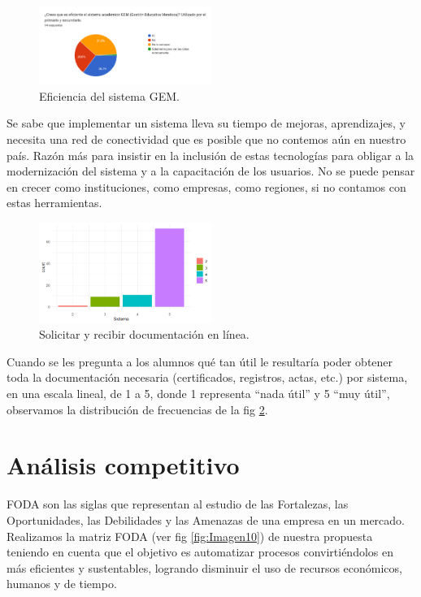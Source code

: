 \documentclass[a4paper]{article}
\begin{document}
\begin{figure}
\centering
\includegraphics[width=0.5\textwidth]{Imagen8.png}
\caption{\label{fig:Imagen8}Eficiencia del sistema GEM.}
\end{figure}

Se sabe que implementar un sistema lleva su tiempo de mejoras, aprendizajes, y necesita una red de conectividad que es posible que no contemos aún en nuestro país. Razón más para insistir en la inclusión de estas tecnologías para obligar a la modernización del sistema y a la capacitación de los usuarios. No se puede pensar en crecer como instituciones, como empresas, como regiones, si no contamos con estas herramientas. 


\begin{figure}
\centering
\includegraphics[width=0.5\textwidth]{Imagen9.png}
\caption{\label{fig:Imagen9}Solicitar y recibir documentación en línea.}
\end{figure}


Cuando se les pregunta a los alumnos qué tan útil le resultaría poder obtener toda la documentación necesaria (certificados, registros, actas, etc.) por sistema, en una escala lineal, de 1 a 5, donde 1 representa “nada útil” y 5 “muy útil”, observamos la distribución de frecuencias de la fig \ref{fig:Imagen9}.

\section{Análisis competitivo}

FODA son las siglas que representan al estudio de las Fortalezas, las Oportunidades, las Debilidades y las Amenazas de una empresa en un mercado. 
Realizamos la matriz FODA (ver fig \ref{fig:Imagen10}) de nuestra propuesta teniendo en cuenta que el objetivo es automatizar procesos convirtiéndolos en más eficientes y sustentables, logrando disminuir el uso de recursos económicos, humanos y de tiempo.
\end{document}
